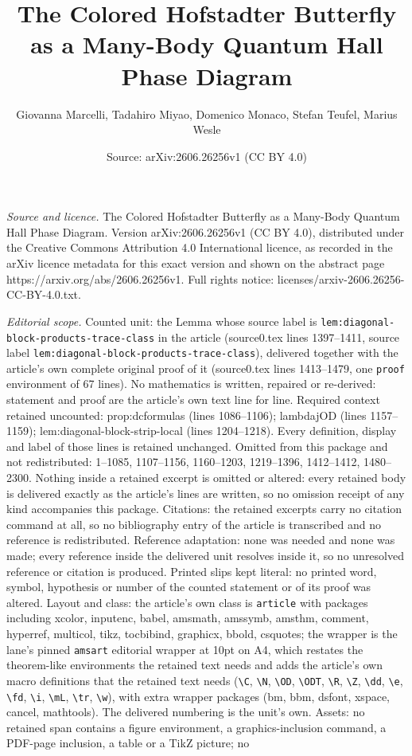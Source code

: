 \documentclass[10pt,a4paper]{amsart}
\title[The Colored Hofstadter Butterfly as a Many-Body Quantum Hall]{The Colored Hofstadter Butterfly as a Many-Body Quantum Hall Phase Diagram}
\author{Giovanna Marcelli, Tadahiro Miyao, Domenico Monaco, Stefan Teufel, Marius Wesle}
\date{Source: arXiv:2606.26256v1 (CC BY 4.0)}
\begin{document}
\maketitle

\noindent\emph{Source and licence.} The Colored Hofstadter Butterfly as a Many-Body Quantum Hall Phase Diagram. Version arXiv:2606.26256v1 (CC BY 4.0), distributed under the Creative Commons Attribution 4.0 International licence, as recorded in the arXiv licence metadata for this exact version and shown on the abstract page https://arxiv.org/abs/2606.26256v1. Full rights notice: licenses/arxiv-2606.26256-CC-BY-4.0.txt.\par\smallskip

\noindent\textit{Editorial scope.} Counted unit: the Lemma whose source label is \texttt{lem:diagonal-block-products-trace-class} in the article (source0.tex lines 1397--1411, source label \texttt{lem:diagonal-block-products-trace-class}), delivered together with the article's own complete original proof of it (source0.tex lines 1413--1479, one \texttt{proof} environment of 67 lines). No mathematics is written, repaired or re-derived: statement and proof are the article's own text line for line. Required context retained uncounted: prop:dcformulas (lines 1086--1106); lambdajOD (lines 1157--1159); lem:diagonal-block-strip-local (lines 1204--1218). Every definition, display and label of those lines is retained unchanged. Omitted from this package and not redistributed: 1--1085, 1107--1156, 1160--1203, 1219--1396, 1412--1412, 1480--2300. Nothing inside a retained excerpt is omitted or altered: every retained body is delivered exactly as the article's lines are written, so no omission receipt of any kind accompanies this package. Citations: the retained excerpts carry no citation command at all, so no bibliography entry of the article is transcribed and no reference is redistributed. Reference adaptation: none was needed and none was made; every reference inside the delivered unit resolves inside it, so no unresolved reference or citation is produced. Printed slips kept literal: no printed word, symbol, hypothesis or number of the counted statement or of its proof was altered. Layout and class: the article's own class is \texttt{article} with packages including xcolor, inputenc, babel, amsmath, amssymb, amsthm, comment, hyperref, multicol, tikz, tocbibind, graphicx, bbold, csquotes; the wrapper is the lane's pinned \texttt{amsart} editorial wrapper at 10pt on A4, which restates the theorem-like environments the retained text needs and adds the article's own macro definitions that the retained text needs (\texttt{\textbackslash C}, \texttt{\textbackslash N}, \texttt{\textbackslash OD}, \texttt{\textbackslash ODT}, \texttt{\textbackslash R}, \texttt{\textbackslash Z}, \texttt{\textbackslash dd}, \texttt{\textbackslash e}, \texttt{\textbackslash fd}, \texttt{\textbackslash i}, \texttt{\textbackslash mL}, \texttt{\textbackslash tr}, \texttt{\textbackslash w}), with extra wrapper packages (bm, bbm, dsfont, xspace, cancel, mathtools). The delivered numbering is the unit's own. Assets: no retained span contains a figure environment, a graphics-inclusion command, a PDF-page inclusion, a table or a TikZ picture; no 
\end{document}
